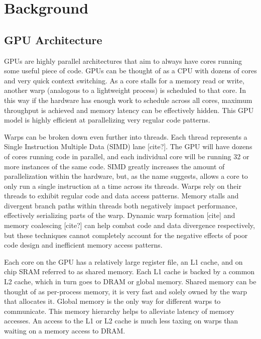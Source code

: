 \chapter{Background}

\section{GPU Architecture}
GPUs are highly parallel architectures that aim to always have cores running some useful piece of code. GPUs can be thought of as a CPU with dozens of cores and very quick context switching. As a core stalls for a memory read or write, another warp (analogous to a lightweight process) is scheduled to that core. In this way if the hardware has enough work to schedule across all cores, maximum throughput is achieved and memory latency can be effectively hidden. This GPU model is highly efficient at parallelizing very regular code patterns.

Warps can be broken down even further into threads. Each thread represents a Single Instruction Multiple Data (SIMD) lane [cite?]. The GPU will have dozens of cores running code in parallel, and each individual core will be running 32 or more instances of the same code. SIMD greatly increases the amount of parallelization within the hardware, but, as the name suggests, allows a core to only run a single instruction at a time across its threads. Warps rely on their threads to exhibit regular code and data access patterns. Memory stalls and divergent branch paths within threads both negatively impact performance, effectively serializing parts of the warp. Dynamic warp formation [cite] and memory coalescing [cite?] can help combat code and data divergence respectively, but these techniques cannot completely account for the negative effects of poor code design and inefficient memory access patterns.

Each core on the GPU has a relatively large register file, an L1 cache, and on chip SRAM referred to as shared memory. Each L1 cache is backed by a common L2 cache, which in turn goes to DRAM or global memory. Shared memory can be thought of as per-process memory, it is very fast and solely owned by the warp that allocates it. Global memory is the only way for different warps to communicate. This memory hierarchy helps to alleviate latency of memory accesses. An access to the L1 or L2 cache is much less taxing on warps than waiting on a memory access to DRAM.


